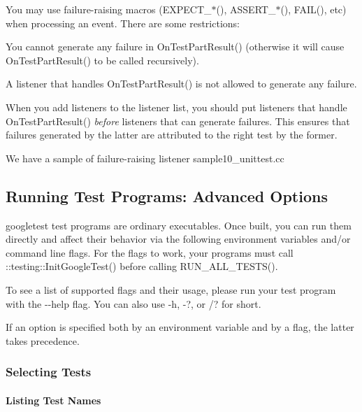 You may use failure-\/raising macros ({\ttfamily E\+X\+P\+E\+C\+T\+\_\+$\ast$()}, {\ttfamily A\+S\+S\+E\+R\+T\+\_\+$\ast$()}, {\ttfamily F\+A\+I\+L()}, etc) when processing an event. There are some restrictions\+:


\begin{DoxyEnumerate}
\item You cannot generate any failure in {\ttfamily On\+Test\+Part\+Result()} (otherwise it will cause {\ttfamily On\+Test\+Part\+Result()} to be called recursively).
\end{DoxyEnumerate}
\begin{DoxyEnumerate}
\item A listener that handles {\ttfamily On\+Test\+Part\+Result()} is not allowed to generate any failure.
\end{DoxyEnumerate}

When you add listeners to the listener list, you should put listeners that handle {\ttfamily On\+Test\+Part\+Result()} {\itshape before} listeners that can generate failures. This ensures that failures generated by the latter are attributed to the right test by the former.

We have a sample of failure-\/raising listener sample10\+\_\+unittest.\+cc

\subsection*{Running Test Programs\+: Advanced Options}

googletest test programs are ordinary executables. Once built, you can run them directly and affect their behavior via the following environment variables and/or command line flags. For the flags to work, your programs must call {\ttfamily \+::testing\+::\+Init\+Google\+Test()} before calling {\ttfamily R\+U\+N\+\_\+\+A\+L\+L\+\_\+\+T\+E\+S\+T\+S()}.

To see a list of supported flags and their usage, please run your test program with the {\ttfamily -\/-\/help} flag. You can also use {\ttfamily -\/h}, {\ttfamily -\/?}, or {\ttfamily /?} for short.

If an option is specified both by an environment variable and by a flag, the latter takes precedence.

\subsubsection*{Selecting Tests}

\paragraph*{Listing Test Names}


